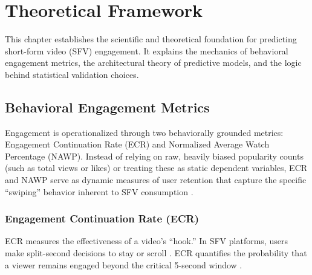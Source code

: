 %
%
%                 


\chapter{Theoretical Framework}
\label{sec:theoframework}
This chapter establishes the scientific and theoretical foundation for predicting short-form video (SFV) engagement. It explains the mechanics of behavioral engagement metrics, the architectural theory of predictive models, and the logic behind statistical validation choices.




\section{Behavioral Engagement Metrics}

Engagement is operationalized through two behaviorally grounded metrics: Engagement Continuation Rate (ECR) and Normalized Average Watch Percentage (NAWP). Instead of relying on raw, heavily biased popularity counts (such as total views or likes) \cite{wu2018beyond} or treating these as static dependent variables, ECR and NAWP serve as dynamic measures of user retention that capture the specific ``swiping'' behavior inherent to SFV consumption \cite{li2024delving}.

\subsection{Engagement Continuation Rate (ECR)}

ECR measures the effectiveness of a video's ``hook.'' In SFV platforms, users make split-second decisions to stay or scroll \cite{zannettou2024analyzing}. ECR quantifies the probability that a viewer remains engaged beyond the critical 5-second window \cite{li2024delving}.

